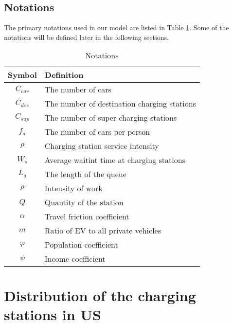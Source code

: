 \documentclass[12pt]{article}  %
\begin{document}
\subsection{Notations}
The primary notations used in our model are listed in Table \ref{tb:notation}. 
Some of the notations will be defined later in the following sections.
\begin{table}[!htbp]
	\begin{center}
		\caption{Notations}
		\begin{tabular}{cl}
			\toprule
			\multicolumn{1}{m{3cm}}{\centering Symbol}
			&\multicolumn{1}{m{8cm}}{\centering Definition}\\
			\midrule
			${C_{car}}$&The number of cars\\
			${C_{des}}$&The number of destination charging stations\\
			${C_{sup}}$&The number of super charging stations\\
			${f_d}$&The number of cars per person\\
			$\rho $&Charging station service intensity\\
			${W_s}$&Average waitint time at charging stations\\
			${L_q}$&The length of the queue\\
			${\rho}$&Intensity of work\\
			${Q}$&Quantity of the station\\
			${\alpha}$&Travel friction coefficient\\
			${m}$&Ratio of EV to all private vehicles\\
			${\varphi}$&Population coefficient\\
			${\psi}$&Income coefficient\\
			\bottomrule
		\end{tabular}\label{tb:notation}
	\end{center}
\end{table}


\section{Distribution of the charging stations in US}
\end{document}
